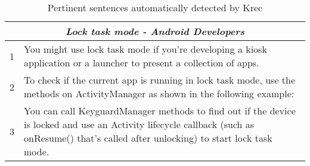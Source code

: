
\begin{table}[H]
\centering    
\begin{scriptsize}
\begin{threeparttable}
\begin{tabular}{ll}
    
\hline
\multicolumn{2}{c}{\textit{Lock task mode - Android Developers}} \\
\hline
\hline

1 & \parbox[l][.8cm][c]{10.5cm}{You might use lock task mode if you're developing a kiosk application or a launcher to present a collection of apps.} \\
2 & \parbox[l][.8cm][c]{10.5cm}{To check if the current app is running in lock task mode, use the methods on ActivityManager as shown in the following example:} \\
3 & \parbox[l][.8cm][c]{10.5cm}{You can call KeyguardManager methods to find out if the device is locked and use an Activity lifecycle callback (such as onResume() that's called after unlocking) to start lock task mode.} \\
\hline

\end{tabular}
\end{threeparttable}
\end{scriptsize}
\caption{Pertinent sentences automatically detected by \acs{Krec}}
\label{tbl:git-example-krec}
\end{table}